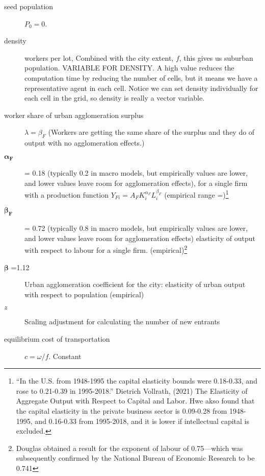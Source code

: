 \begin{description}
\item [seed population] $P_0=0$. %

\item  [density]  workers per lot, Combined with the city extent, $f$, this gives us suburban population. VARIABLE FOR DENSITY. A high value reduces the computation time by reducing the number of cells, but it means we have a representative agent in  each cell. Notice we can set density individually for each cell in the grid, so density is really a vector variable.%

\item [worker share of urban agglomeration surplus] $\lambda=\beta_F$ (Workers are getting the same share of the surplus and they do of output with no agglomeration effects.)

\item  [$\mathbf{\alpha_F}$ ] =  0.18 (typically 0.2 in macro models, but empirically values are lower, and lower values leave room for agglomeration effects),  for a single firm with a production function $Y_{Fi}=A_F K_i^{\alpha_F }L^{\beta_F}_i$ (empirical range =)\footnote{``In the U.S. from 1948-1995 the capital elasticity bounds were 0.18-0.33, and rose to 0.21-0.39 in 1995-2018.'' Dietrich Vollrath, (2021) The Elasticity of Aggregate Output with Respect to Capital and Labor. Hwe akso found that the capital elasticity in the private business sector is 0.09-0.28 from 1948-1995, and 0.16-0.33 from 1995-2018, and it is lower if intellectual capital is excluded.}

\item  [$\mathbf{\beta_F}$ ]  = 0.72 (typically 0.8 in macro models, but empirically values are lower, and lower values leave room for agglomeration effects) elasticity of output with respect to labour for a single firm. (empirical)\footnote{Douglas  obtained a result for the exponent of labour of 0.75—which was subsequently confirmed by the National Bureau of Economic Research to be 0.741} 

\item  [$\mathbf{\beta}$ =1.12] Urban agglomeration coefficient for the city: elasticity of urban output with respect to population (empirical)

\item [$z$] Scaling adjustment for calculating the number of new entrants 

\item [equilibrium cost of transportation] $c = \omega/f$. Constant

\end{description}



